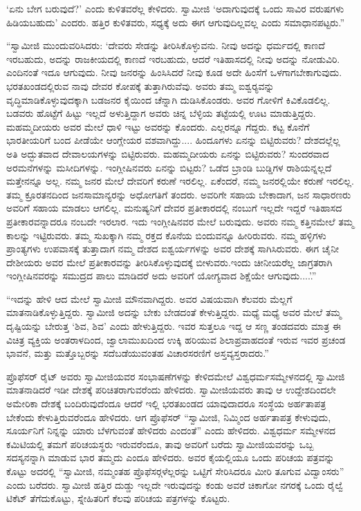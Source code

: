  ‘ಏನು ಬೇಗ ಬರುವುದೆ?’ ಎಂದು ಕುಳಿತವರೆಲ್ಲ ಕೇಳಿದರು. ಸ್ವಾಮೀಜಿ ‘ಅದಾಗುವುದಕ್ಕೆ ಒಂದು ಸಾವಿರ ವರುಷಗಳು ಹಿಡಿಯಬಹುದು’ ಎಂದರು. ಹತ್ತಿರ ಕುಳಿತವರು, ಸಧ್ಯಕ್ಕೆ ಅದು ಈಗ ಆಗುವುದಿಲ್ಲವಲ್ಲ ಎಂದು ಸಮಾಧಾನಪಟ್ಟರು.” 

 “ಸ್ವಾಮೀಜಿ ಮುಂದುವರಿಸಿದರು: ‘ದೇವರು ಸೇಡನ್ನು ತೀರಿಸಿಕೊಳ್ಳುವನು. ನೀವು ಅದನ್ನು ಧರ್ಮದಲ್ಲಿ ಕಾಣದೆ ಇರಬಹುದು, ಅದನ್ನು ರಾಜಕೀಯದಲ್ಲಿ ಕಾಣದೆ ಇರಬಹುದು, ಆದರೆ ಇತಿಹಾಸದಲ್ಲಿ ನೀವು ಅದನ್ನು ನೋಡುವಿರಿ. ಎಂದಿನಂತೆ ಇದೂ ಆಗುವುದು. ನೀವು ಜನರನ್ನು ಹಿಂಸಿಸಿದರೆ ನೀವು ಕೂಡ ಅದೇ ಹಿಂಸೆಗೆ ಒಳಗಾಗಬೇಕಾಗುವುದು. ಭರತಖಂಡದಲ್ಲಿರುವ ನಾವು ದೇವರ ಕೋಪಕ್ಕೆ ತುತ್ತಾಗಿರುವೆವು. ಅವರು ತಮ್ಮ ಐಶ್ವರ‍್ಯವನ್ನು ವೃದ್ಧಿಮಾಡಿಕೊಳ್ಳುವುದಕ್ಕಾಗಿ ಬಡಜನರ ಕೈಯಿಂದ ಚೆನ್ನಾಗಿ ದುಡಿಸಿಕೊಂಡರು. ಅವರ ಗೋಳಿಗೆ ಕಿವಿಕೊಡಲಿಲ್ಲ. ಬಡವರು ಹೊಟ್ಟೆಗೆ ಹಿಟ್ಟು ಇಲ್ಲದೆ ಅಳುತ್ತಿದ್ದಾಗ ಅವರು ಚಿನ್ನ ಬೆಳ್ಳಿಯ ತಟ್ಟೆಯಲ್ಲಿ ಊಟ ಮಾಡುತ್ತಿದ್ದರು. ಮಹಮ್ಮದೀಯರು ಅವರ ಮೇಲೆ ಧಾಳಿ ಇಟ್ಟು ಅವರನ್ನು ಕೊಂದರು. ಎಲ್ಲರನ್ನೂ ಗೆದ್ದರು. ಕಟ್ಟ ಕೊನೆಗೆ ಭಾರತೀಯರಿಗೆ ಬಂದ ಪೀಡೆಯೇ ಆಂಗ್ಲೇಯರ ವಶವಾಗಿದ್ದು.... ಹಿಂದೂಗಳು ಏನನ್ನು ಬಿಟ್ಟಿರುವರು? ದೇಶದಲ್ಲೆಲ್ಲ ಅತಿ ಅದ್ಭುತವಾದ ದೇವಾಲಯಗಳನ್ನು ಬಿಟ್ಟಿರುವರು. ಮಹಮ್ಮದೀಯರು ಏನನ್ನು ಬಿಟ್ಟಿರುವರು? ಸುಂದರವಾದ ಅರಮನೆಗಳನ್ನು ಮಸೀದಿಗಳನ್ನು. ಇಂಗ್ಲೀಷಿನವರು ಏನನ್ನು ಬಿಟ್ಟರು? ಒಡೆದ ಬ್ರಾಂಡಿ ಬುಡ್ಡಿಗಳ ರಾಶಿಯನ್ನಲ್ಲದೆ ಮತ್ತೇನನ್ನೂ ಅಲ್ಲ. ನಮ್ಮ ಜನರ ಮೇಲೆ ದೇವರಿಗೆ ಕರುಣೆ ಇರಲಿಲ್ಲ. ಏಕೆಂದರೆ, ನಮ್ಮ ಜನರಲ್ಲಿಯೇ ಕರುಣೆ ಇರಲಿಲ್ಲ. ತಮ್ಮ ಕ್ರೂರತನದಿಂದ ಜನಸಾಮಾನ್ಯರನ್ನು ಅಧೋಗತಿಗೆ ತಂದರು. ಅವರಿಗೇ ಸಹಾಯ ಬೇಕಾದಾಗ, ಜನ ಸಾಧಾರಣರು ಅವರಿಗೆ ಸಹಾಯ ಮಾಡಲು ಆಗಲಿಲ್ಲ. ಮನುಷ್ಯನಿಗೆ ದೇವರ ಪ್ರತೀಕಾರದಲ್ಲಿ ನಂಬುಗೆ ಇಲ್ಲದೇ ಇದ್ದರೆ ಇತಿಹಾಸದ ಪ್ರತೀಕಾರವನ್ನಾದರೂ ನಂಬದೇ ಇರಲಾರ. ಇದು ಇಂಗ್ಲೀಷಿನವರ ಮೇಲೆ ಬರುವುದು. ಅವರು ನಮ್ಮ ಕತ್ತಿನಮೇಲೆ ತಮ್ಮ ಕಾಲನ್ನು ಇಟ್ಟಿರುವರು. ತಮ್ಮ ಸುಖಕ್ಕಾಗಿ ನಮ್ಮ ರಕ್ತದ ಕೊನೆಯ ಬಿಂದುವನ್ನೂ ಹೀರಿರುವರು. ನಮ್ಮ ಹಳ್ಳಿಗಳು ಪ್ರಾಂತ್ಯಗಳು ಉಪವಾಸಕ್ಕೆ ತುತ್ತಾದಾಗ ನಮ್ಮ ದೇಶದ ಐಶ್ವರ್ಯಗಳನ್ನು ಅವರ ದೇಶಕ್ಕೆ ಸಾಗಿಸಿರುವರು. ಈಗ ಚೈನೀ ದೇಶೀಯರು ಅವರ ಮೇಲೆ ಪ್ರತೀಕಾರವನ್ನು ತೀರಿಸಿಕೊಳ್ಳುವುದಕ್ಕೆ ಬೀಳುವರು.\break ಇಂದು ಚೀನೀಯರೆಲ್ಲ ಜಾಗ್ರತರಾಗಿ ಇಂಗ್ಲೀಷಿನವರನ್ನು ಸಮುದ್ರದ ಪಾಲು ಮಾಡಿದರೆ ಅದು ಅವರಿಗೆ ಯೋಗ್ಯವಾದ ಶಿಕ್ಷೆಯೇ ಆಗುವುದು....’.” 

 “ಇದನ್ನು ಹೇಳಿ ಆದ ಮೇಲೆ ಸ್ವಾಮೀಜಿ ಮೌನವಾಗಿದ್ದರು. ಅವರ ವಿಷಯವಾಗಿ ಕೆಲವರು ಮೆಲ್ಲಗೆ ಮಾತನಾಡಿಕೊಳ್ಳುತ್ತಿದ್ದರು. ಸ್ವಾಮೀಜಿ ಅದನ್ನು ಬೇಕು ಬೇಡದಂತೆ ಕೇಳುತ್ತಿದ್ದರು. ಮಧ್ಯೆ ಮಧ್ಯೆ ಅವರ ಮೇಲೆ ತಮ್ಮ ದೃಷ್ಟಿಯನ್ನು ಬೇರುತ್ತ ‘ಶಿವ, ಶಿವ’ ಎಂದು ಹೇಳುತ್ತಿದ್ದರು. ಇವರ ಸುತ್ತಲೂ ಇದ್ದ ಆ ಸಣ್ಣ ತಂಡದವರು ಮಾತ್ರ ಈ ವಿಚಿತ್ರ ವ್ಯಕ್ತಿಯ ಅಂತರಾಳದಿಂದ, ಜ್ವಾಲಾಮುಖದಿಂದ ಉಕ್ಕಿ ಹರಿಯುವ ಶಿಲಾಪ್ರವಾಹದಂತೆ ಇರುವ ಇವರ ಪ್ರಚಂಡ ಭಾವನೆ, ಮತ್ತು ಮತ್ತೊಬ್ಬರನ್ನು ಸದೆಬಡೆಯುವಂತಹ ವಿಚಾರಸರಣಿಗೆ ಅಸ್ತವ್ಯಸ್ತರಾದರು.” 

 ಪ್ರೊಫೆಸರ್ ರೈಟ್ ಅವರು ಸ್ವಾಮೀಜಿಯವರ ಸಂಭಾಷಣೆಗಳನ್ನು ಕೇಳಿದಮೇಲೆ ವಿಶ್ವಧರ್ಮಸಮ್ಮೇಳನದಲ್ಲಿ ಸ್ವಾಮೀಜಿ ಮಾತನಾಡಿದರೆ ಇಡೀ ದೇಶಕ್ಕೆ ಪರಿಚಿತರಾಗುವರೆಂದು ಹೇಳಿದರು. ಸ್ವಾಮೀಜಿಯವರು ತಾವು ಆ ಉದ್ದೇಶದಿಂದಲೇ ಅಮೇರಿಕಾ ದೇಶಕ್ಕೆ ಬಂದಿರುವುದೆಂದೂ ಆದರೆ ಇಲ್ಲಿ ಭರತಖಂಡದ ಯಾವುದಾದರೂ ಸಂಸ್ಥೆಯ ಅರ್ಹತಾಪತ್ರ ಬೇಕೆಂದು ಕೇಳುತ್ತಿರುವರೆಂದೂ ಹೇಳಿದರು. ಆಗ ಪ್ರೊಫೆಸರ್ “ಸ್ವಾಮೀಜಿ, ನಿಮ್ಮಿಂದ ಅರ್ಹತಾಪತ್ರ ಕೇಳುವುದು, ಸೂರ್ಯನಿಗೆ ನಿನ್ನನ್ನು ಯಾರು ಬೆಳಗುವಂತೆ ಹೇಳಿದರು ಎಂದಂತೆ” ಎಂದು ಹೇಳಿದರು. ವಿಶ್ವಧರ್ಮ ಸಮ್ಮೇಳನದ ಕಮಿಟಿಯಲ್ಲಿ ತಮಗೆ ಪರಿಚಯಸ್ಥರು ಇರುವರೆಂದೂ, ತಾವು ಅವರಿಗೆ ಬರೆದು ಸ್ವಾಮೀಜಿಯವರನ್ನು ಒಬ್ಬ ಸದಸ್ಯನನ್ನಾಗಿ ಮಾಡುವ ಭಾರ ತಮ್ಮದು ಎಂದೂ ಹೇಳಿದರು. ಅವರ ಕೈಯಲ್ಲಿಯೂ ಒಂದು ಪರಿಚಯ ಪತ್ರವನ್ನು ಕೊಟ್ಟು ಅದರಲ್ಲಿ “ಸ್ವಾಮೀಜಿ, ನಮ್ಮಂತಹ ಪ್ರೊಫೆಸರ್‍ಗಳೆಲ್ಲರನ್ನು ಒಟ್ಟಿಗೆ ಸೇರಿಸಿದರೂ ಮೀರಿ ತೂಗುವ ವಿದ್ವಾಂಸರು” ಎಂದು ಬರೆದರು. ಸ್ವಾಮೀಜಿ ಹತ್ತಿರ ದುಡ್ಡು ಇಲ್ಲದೇ ಇರುವುದನ್ನು ಕಂಡು ಅವರೆ ಚಿಕಾಗೋ ನಗರಕ್ಕೆ ಒಂದು ರೈಲ್ವೆ ಟಿಕೆಟ್ ತೆಗೆದುಕೊಟ್ಟು, ಸ್ನೇಹಿತರಿಗೆ ಕೆಲವು ಪರಿಚಯ ಪತ್ರಗಳನ್ನು ಕೊಟ್ಟರು. 

